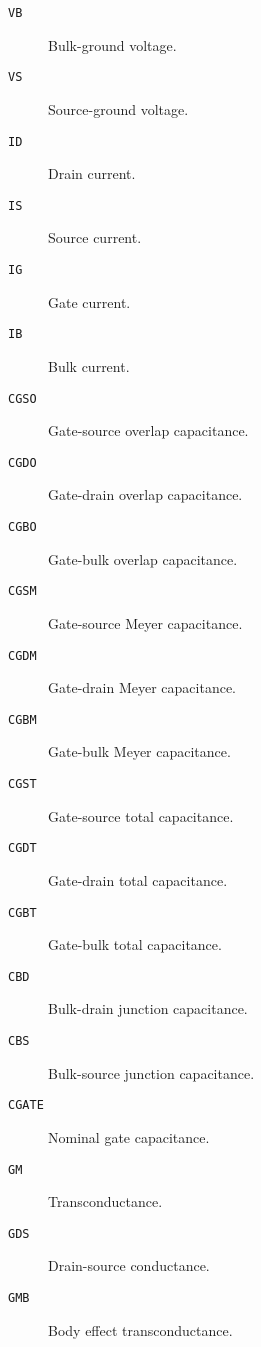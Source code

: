 \begin{description}
\item[{\tt VB}] Bulk-ground voltage.

\item[{\tt VS}] Source-ground voltage.

\item[{\tt ID}] Drain current.

\item[{\tt IS}] Source current.

\item[{\tt IG}] Gate current.

\item[{\tt IB}] Bulk current.

\item[{\tt CGSO}] Gate-source overlap capacitance.

\item[{\tt CGDO}] Gate-drain overlap capacitance.

\item[{\tt CGBO}] Gate-bulk overlap capacitance.

\item[{\tt CGSM}] Gate-source Meyer capacitance.

\item[{\tt CGDM}] Gate-drain Meyer capacitance.

\item[{\tt CGBM}] Gate-bulk Meyer capacitance.

\item[{\tt CGST}] Gate-source total capacitance.

\item[{\tt CGDT}] Gate-drain total capacitance.

\item[{\tt CGBT}] Gate-bulk total capacitance.

\item[{\tt CBD}] Bulk-drain junction capacitance.

\item[{\tt CBS}] Bulk-source junction capacitance.

\item[{\tt CGATE}] Nominal gate capacitance.

\item[{\tt GM}] Transconductance.

\item[{\tt GDS}] Drain-source conductance.

\item[{\tt GMB}] Body effect transconductance.


\end{description}
